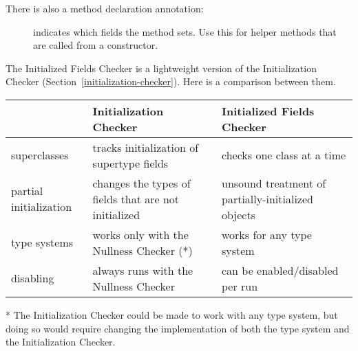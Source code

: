 
There is also a method declaration annotation:

\begin{description}
\item[]
  indicates which fields the method sets.  Use this for helper methods that
  are called from a constructor.
\end{description}



The Initialized Fields Checker is a lightweight version of the  Initialization Checker
(Section~\ref{initialization-checker}).  Here is a comparison between them.

\noindent
\begin{small}
\begin{tabular}{| l | l | l |}
 \hline
 & Initialization Checker & Initialized Fields Checker
 \\ \hline
 superclasses
 & tracks initialization of supertype fields
 & checks one class at a time
 \\
 partial initialization
 & changes the types of fields that are not initialized
 & unsound treatment of partially-initialized objects
 \\
 type systems
 & works only with the Nullness Checker (*)
 & works for any type system
 \\
 disabling
 & always runs with the Nullness Checker
 & can be enabled/disabled per run
 \\
 \hline
\end{tabular}

\noindent
* The Initialization Checker could be made to work with any type system, but
doing so would require changing the implementation of both the type system and
the Initialization Checker.
\end{small}


